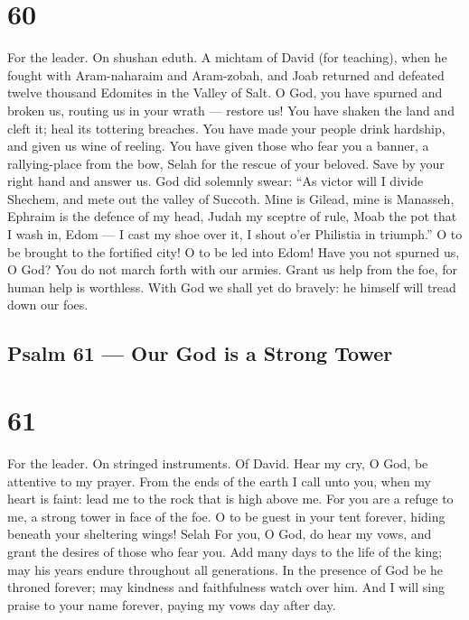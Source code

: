 \hypertarget{section-59}{%
\section{60}\label{section-59}}

For the leader. On shushan eduth. A michtam of David (for teaching),
when he fought with Aram-naharaim and Aram-zobah, and Joab returned and
defeated twelve thousand Edomites in the Valley of Salt.  O
God, you have spurned and broken us, routing us in your wrath ---
restore us!  You have shaken the land and cleft it; heal its
tottering breaches.  You have made your people drink
hardship, and given us wine of reeling.  You have given
those who fear you a banner, a rallying-place from the bow, Selah
 for the rescue of your beloved. Save by your right hand and
answer us.  God did solemnly swear: ``As victor will I
divide Shechem, and mete out the valley of Succoth.  Mine is
Gilead, mine is Manasseh, Ephraim is the defence of my head, Judah my
sceptre of rule,  Moab the pot that I wash in, Edom --- I
cast my shoe over it, I shout o'er Philistia in triumph.'' 
O to be brought to the fortified city! O to be led into Edom!
 Have you not spurned us, O God? You do not march forth
with our armies.  Grant us help from the foe, for human
help is worthless.  With God we shall yet do bravely: he
himself will tread down our foes.

\hypertarget{psalm-61-our-god-is-a-strong-tower}{%
\subsection{Psalm 61 --- Our God is a Strong
Tower}\label{psalm-61-our-god-is-a-strong-tower}}

\hypertarget{section-60}{%
\section{61}\label{section-60}}

For the leader. On stringed instruments. Of David.  Hear my
cry, O God, be attentive to my prayer.  From the ends of the
earth I call unto you, when my heart is faint: lead me to the rock that
is high above me.  For you are a refuge to me, a strong
tower in face of the foe.  O to be guest in your tent
forever, hiding beneath your sheltering wings! Selah  For
you, O God, do hear my vows, and grant the desires of those who fear
you.  Add many days to the life of the king; may his years
endure throughout all generations.  In the presence of God
be he throned forever; may kindness and faithfulness watch over him.
 And I will sing praise to your name forever, paying my vows
day after day.

